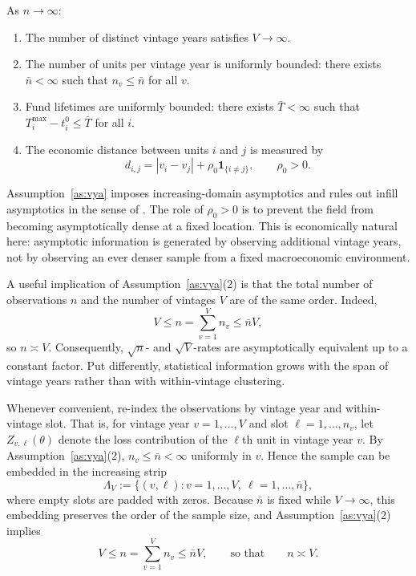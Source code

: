 \begin{assume}
	\label{as:vya}
	As \(n \to \infty\):
	\begin{enumerate}
		\item The number of distinct vintage years satisfies \(V \to \infty\).
		\item The number of units per vintage year is uniformly bounded: there exists \(\bar n < \infty\) such that \(n_v \le \bar n\) for all \(v\).
		\item Fund lifetimes are uniformly bounded: there exists \(\bar T < \infty\) such that \(T_i^{\max} - t_i^0 \le \bar T\) for all \(i\).
		\item The economic distance between units \(i\) and \(j\) is measured by
		\[
		d_{i,j}
		=
		|v_i - v_j|
		+
		\rho_0 \mathbf{1}_{\{i \neq j\}},
		\qquad
		\rho_0 > 0.
		\]
	\end{enumerate}
\end{assume}

Assumption~\ref{as:vya} imposes increasing-domain asymptotics and rules out infill asymptotics in the sense of \citet{JP12}. The role of \(\rho_0>0\) is to prevent the field from becoming asymptotically dense at a fixed location. This is economically natural here: asymptotic information is generated by observing additional vintage years, not by observing an ever denser sample from a fixed macroeconomic environment.

A useful implication of Assumption~\ref{as:vya}(2) is that the total number of observations \(n\) and the number of vintages \(V\) are of the same order. Indeed,
\[
V
\le
n
=
\sum_{v=1}^V n_v
\le
\bar n V,
\]
so \(n \asymp V\). Consequently, \(\sqrt{n}\)- and \(\sqrt{V}\)-rates are asymptotically equivalent up to a constant factor. Put differently, statistical information grows with the span of vintage years rather than with within-vintage clustering.

Whenever convenient, re-index the observations by vintage year and within-vintage slot. That is, for vintage year $v=1,\dots,V$ and slot $\ell=1,\dots,n_v$, let $Z_{v,\ell}(\theta)$ denote the loss contribution of the $\ell$th unit in vintage year $v$. By Assumption~\ref{as:vya}(2), $n_v \le \bar n < \infty$ uniformly in $v$. Hence the sample can be embedded in the increasing strip
\[
\Lambda_V
:=
\{(v,\ell): v=1,\dots,V,\ \ell=1,\dots,\bar n\},
\]
where empty slots are padded with zeros. Because $\bar n$ is fixed while $V \to \infty$, this embedding preserves the order of the sample size, and Assumption~\ref{as:vya}(2) implies
\[
V \le n = \sum_{v=1}^V n_v \le \bar n V,
\qquad\text{so that}\qquad
n \asymp V.
\]

